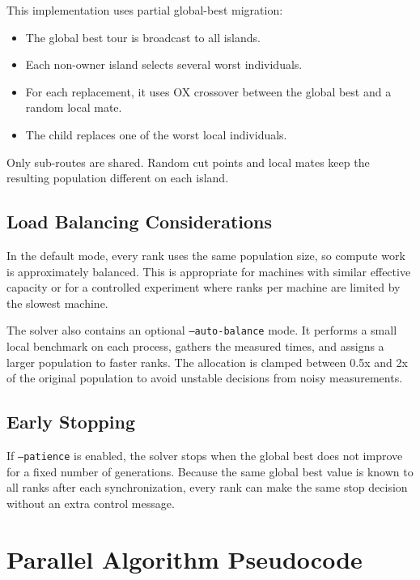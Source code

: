 \documentclass[11pt,a4paper]{article}
\begin{document}
This implementation uses partial global-best migration:

\begin{itemize}[leftmargin=*]
  \item The global best tour is broadcast to all islands.
  \item Each non-owner island selects several worst individuals.
  \item For each replacement, it uses OX crossover between the global best and a
  random local mate.
  \item The child replaces one of the worst local individuals.
\end{itemize}

Only sub-routes are shared. Random cut points and local mates keep the resulting
population different on each island.

\subsection{Load Balancing Considerations}
In the default mode, every rank uses the same population size, so compute work is
approximately balanced. This is appropriate for machines with similar effective
capacity or for a controlled experiment where ranks per machine are limited by
the slowest machine.

The solver also contains an optional \texttt{--auto-balance} mode. It performs a
small local benchmark on each process, gathers the measured times, and assigns a
larger population to faster ranks. The allocation is clamped between 0.5x and 2x
of the original population to avoid unstable decisions from noisy measurements.

\subsection{Early Stopping}
If \texttt{--patience} is enabled, the solver stops when the global best does not
improve for a fixed number of generations. Because the same global best value is
known to all ranks after each synchronization, every rank can make the same stop
decision without an extra control message.

\section{Parallel Algorithm Pseudocode}
\end{document}
